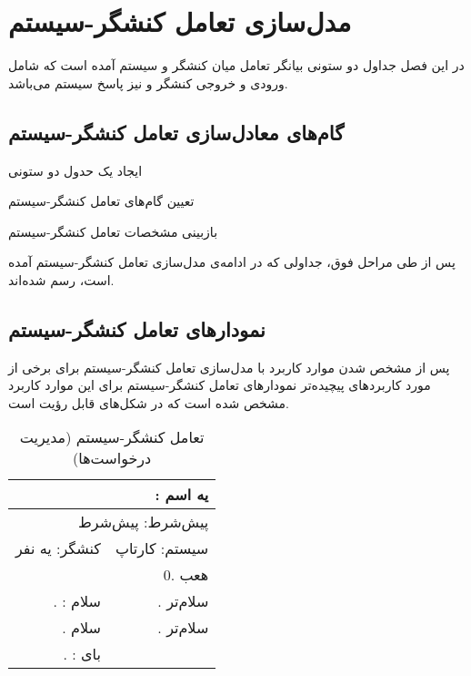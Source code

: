 \documentclass[12pt,svgnames,oneside]{book}
\newcounter{itemadded}
\let\LaTeXStandardEnumerateBegin\enumerate
\let\LaTeXStandardEnumerateEnd\endenumerate
\renewenvironment{enumerate}{%
\LaTeXStandardEnumerateBegin%
\setcounter{itemadded}{0}
}{%
\LaTeXStandardEnumerateEnd%
}%
\newcommand{\uc}[1]{\lr{U{#1}}}
\newcommand{\tucbw}{\lr{TUCBW}}
\newcommand{\tucew}{\lr{TUCEW}}
\newcommand{\actorsystem}[1]{
کنشگر: {#1} &
سیستم: کارتاپ \\
}
\newcommand{\zerostep}[1]{
& 0. {#1} \\
}
\newcounter{UseCaseCounter}
\newcommand{\step}[1]{
\stepcounter{UseCaseCounter}\arabic{UseCaseCounter}. {#1}
}
\newcommand{\ucname}[2]{
\multicolumn{2}{|r|}{\uc{0{#1}}: {#2}} \\
}
\newcommand{\preif}[1]{
\multicolumn{2}{|r|}{پیش‌شرط:‌ {#1}} \\
}
\begin{document}
\chapter{مدل‌سازی تعامل کنشگر-سیستم}
در این فصل جداول دو‌ ستونی بیانگر تعامل میان کنشگر و سیستم آمده است که شامل ورودی و خروجی کنشگر و نیز پاسخ سیستم می‌باشد.


\section{گام‌های معادل‌سازی تعامل کنشگر-سیستم}
\begin{enumerate}
\item 
ایجاد یک حدول دو ستونی

\item 
تعیین گام‌های تعامل کنشگر-سیستم

\item 
بازبینی مشخصات تعامل کنشگر-سیستم
\end{enumerate}

پس از طی مراحل فوق، جداولی که در ادامه‌ی مدل‌سازی تعامل کنشگر-سیستم آمده‌ است، رسم شده‌اند.

\section{نمودار‌های تعامل کنشگر-سیستم}
پس از مشخص شدن موارد کاربرد با مدل‌سازی تعامل کنشگر-سیستم برای برخی از مورد‌ کاربرد‌های پیچیده‌تر نمودار‌های تعامل کنشگر-سیستم برای این موارد کاربرد مشخص شده است که در شکل‌های 
قابل رؤیت است.

\begin{table}[H]
\caption{تعامل کنشگر-سیستم  (مدیریت درخواست‌ها)}
\begin{center}
\begin{tabular}{|r|r|}
\hline

\ucname{n}{یه اسم}
\hline

\preif{پیش‌شرط}
\hline

\actorsystem{یه نفر}
\hline

\zerostep{هعب}
\hline

\step{\tucbw: سلام} & 
\step{سلام‌تر} \\
\hline

\step{سلام} & 
\step{سلام‌تر} \\
\hline

\step{\tucew: بای} & 
\\
\hline

\end{tabular}
\end{center}
\end{table}
\end{document}

